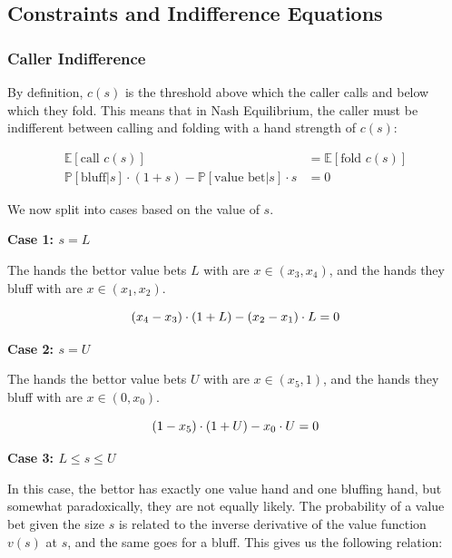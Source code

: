 \documentclass[a4paper,12pt]{article}
\begin{document}


\subsection{Constraints and Indifference Equations}

\subsubsection{Caller Indifference}

By definition, $c(s)$ is the threshold above which the caller calls and below which they fold. This means that in Nash Equilibrium, the caller must be indifferent between calling and folding with a hand strength of $c(s)$:

\begin{align*}
    \mathbb{E}[\text{call } c(s)] & = \mathbb{E}[\text{fold } c(s)]\\
    \mathbb{P}[\text{bluff} | s] \cdot (1+s) - \mathbb{P}[\text{value bet} | s]\cdot s & = 0 
\end{align*}

We now split into cases based on the value of $s$.


\textbf{Case 1: $s = L$}

The hands the bettor value bets $L$ with are $x \in (x_3, x_4)$, and the hands they bluff with are $x \in (x_1, x_2)$. 

\begin{equation}{\label{callindiffmin}}
    (x_4-x_3) \cdot (1+L) - (x_2-x_1) \cdot L = 0
\end{equation}

\textbf{Case 2: $s = U$}

The hands the bettor value bets $U$ with are $x \in (x_5, 1)$, and the hands they bluff with are $x \in (0, x_0)$. 

\begin{equation}{\label{callindiffmax}}
    (1-x_5) \cdot (1+U) - x_0 \cdot U = 0
\end{equation}


\textbf{Case 3: $L \leq s \leq U$}

In this case, the bettor has exactly one value hand and one bluffing hand, but somewhat paradoxically, they are not equally likely. The probability of a value bet given the size $s$ is related to the inverse derivative of the value function $v(s)$ at $s$, and the same goes for a bluff. This gives us the following relation:
\end{document}
